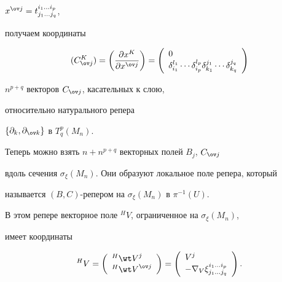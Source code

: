 $x^{\ov j} = t_{j_1 \dotsc j_q}^{i_1 \dotsc i_p}$,


получаем координаты


$$


(C^K_{\ov j}) = \left( \frac{\partial x^K}{\partial x^{\ov j}} \right) = 


\left( 


\begin{array}{l} 0 \\ \delta^{l_1}_{i_1} \cdots \delta^{l_p}_{i_p}


\delta^{j_1}_{k_1} \cdots \delta^{j_q}_{k_q}


\end{array}


\right) 


$$


$n^{p+q}$ векторов $C_{\ov j}$, касательных к слою,


относительно натурального репера 


$\{\partial_k, \partial_{\ov k}\}$ в $T^p_q(M_n)$.





Теперь можно взять $n+n^{p+q}$ векторных полей $B_j$, $C_{\ov j}$ 


вдоль сечения $\sigma_\xi(M_n)$. Они образуют локальное поле репера, который 


называется $(B,C)$-репером на $\sigma_\xi(M_n)$ в $\pi^{-1}(U)$.


В этом репере векторное поле ${}^HV$, ограниченное на $\sigma_\xi(M_n)$,


имеет координаты 


$$


{}^HV = 


\left( 


\begin{array}{l} {}^H{\wt V}^j \\ {}^H{\wt V}^{\ov j} 


\end{array}


\right) 


=


\left( 


\begin{array}{l} V^j \\ -\nabla_V\xi_{j_1 \dotsc j_q}^{i_1 \dotsc i_p}


\end{array}


\right).


$$





